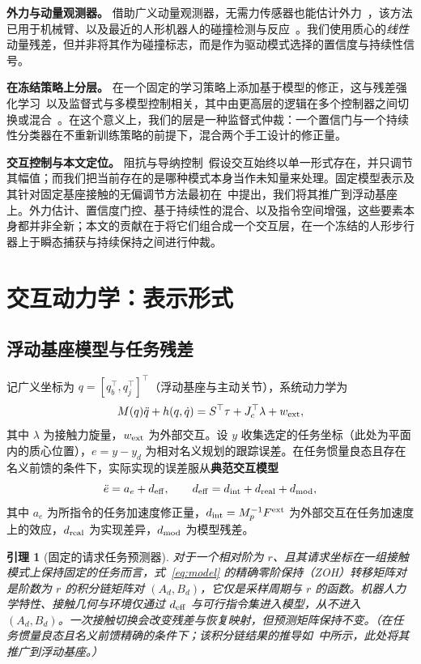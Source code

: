 \documentclass[journal]{IEEEtran}
\newtheorem{lemma}{引理}
\begin{document}
\textbf{外力与动量观测器。} 借助广义动量观测器，无需力传感器也能估计外力~\cite{r14,r15}，该方法已用于机械臂、以及最近的人形机器人的碰撞检测与反应~\cite{r25}。我们使用质心的\emph{线性}动量残差，但并非将其作为碰撞标志，而是作为驱动模式选择的置信度与持续性信号。

\textbf{在冻结策略上分层。} 在一个固定的学习策略上添加基于模型的修正，这与残差强化学习~\cite{r23}以及监督式与多模型控制相关，其中由更高层的逻辑在多个控制器之间切换或混合~\cite{r24}。在这个意义上，我们的层是一种监督式仲裁：一个置信门与一个持续性分类器在不重新训练策略的前提下，混合两个手工设计的修正量。

\textbf{交互控制与本文定位。} 阻抗与导纳控制~\cite{r6,r11,r12}假设交互始终以单一形式存在，并只调节其幅值；而我们把当前存在的是哪种模式本身当作未知量来处理。固定模型表示及其针对固定基座接触的无偏调节方法最初在~\cite{r1}中提出，我们将其推广到浮动基座上。外力估计、置信度门控、基于持续性的混合、以及指令空间增强，这些要素本身都并非全新；本文的贡献在于将它们组合成一个交互层，在一个冻结的人形步行器上于瞬态捕获与持续保持之间进行仲裁。

\section{交互动力学：表示形式}
\label{sec:rep}

\subsection{浮动基座模型与任务残差}
\label{sec:rep-model}

记广义坐标为 $q=[q_b^\top,q_j^\top]^\top$（浮动基座与主动关节），系统动力学为
\begin{equation}
M(q)\ddot q+h(q,\dot q)=S^\top\tau+J_c^\top\lambda+w_{\rm ext},
\label{eq:dyn}
\end{equation}
其中 $\lambda$ 为接触力旋量，$w_{\rm ext}$ 为外部交互。设 $y$ 收集选定的任务坐标（此处为平面内的质心位置），$e=y-y_d$ 为相对名义规划的跟踪误差。在任务惯量良态且存在名义前馈的条件下，实际实现的误差服从\textbf{典范交互模型}
\begin{equation}
\ddot e=a_e+d_{\rm eff},\qquad d_{\rm eff}=d_{\rm int}+d_{\rm real}+d_{\rm mod},
\label{eq:model}
\end{equation}
其中 $a_e$ 为所指令的任务加速度修正量，$d_{\rm int}=M_p^{-1}F^{\rm ext}$ 为外部交互在任务加速度上的效应，$d_{\rm real}$ 为实现差异，$d_{\rm mod}$ 为模型残差。

\begin{lemma}[固定的请求任务预测器]
\label{lem:model}
对于一个相对阶为 $r$、且其请求坐标在一组接触模式上保持固定的任务而言，式~\eqref{eq:model} 的精确零阶保持（ZOH）转移矩阵对是阶数为 $r$ 的积分链矩阵对 $(A_d,B_d)$，它仅是采样周期与 $r$ 的函数。机器人力学特性、接触几何与环境仅通过 $d_{\rm eff}$ 与可行指令集进入模型，从不进入 $(A_d,B_d)$。一次接触切换会改变残差与恢复映射，但预测矩阵保持不变。（在任务惯量良态且名义前馈精确的条件下；该积分链结果的推导如~\cite{r1}中所示，此处将其推广到浮动基座。）
\end{lemma}
\end{document}
